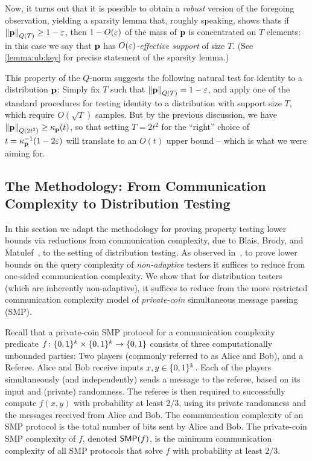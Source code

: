 Now, it turns out that it is possible to obtain a \emph{robust} version of the foregoing observation, yielding a sparsity lemma that, roughly speaking, shows thats if $\lVert\mathbf{p}{\rVert}_{Q(T)} \geq 1-\varepsilon$, then $1- O(\varepsilon)$ of the mass of $\mathbf{p}$ is concentrated on $T$ elements: in this case we say that $\mathbf{p}$ has \emph{$O(\varepsilon)$-effective support} of size $T$. (See \cref{lemma:ub:key} for precise statement of the sparsity lemma.)

 This property of the $Q$-norm suggests the following natural test for identity to a distribution $\mathbf{p}$: Simply fix $T$ such that  $\lVert\mathbf{p}{\rVert}_{Q(T)} = 1-\varepsilon$, and apply one of the standard procedures for testing identity to a distribution with support size $T$, which require $O(\sqrt{T})$ samples. But by the previous discussion, we have $\lVert\mathbf{p}{\rVert}_{Q(2t^2)} \geq \kappa_{\mathbf{p}}(t)$, so that setting $T=2t^2$ for the ``right'' choice of $t=\kappa_{\mathbf{p}}^{-1}(1-2\varepsilon)$ will translate to an $O(t)$ upper bound -- which is what we were aiming for.
 
\subsection{The Methodology: From Communication Complexity to Distribution Testing}\label{sec:methodology}
In this section we adapt the methodology for proving property testing lower bounds via reductions from communication complexity, due to Blais, Brody, and Matulef~\cite{BBM:12}, to the setting of distribution testing.  As observed in~\cite{BBM:12,BMW:11}, to prove lower bounds on the query complexity of \emph{non-adaptive} testers it suffices to reduce from one-sided communication complexity. We show that for distribution testers (which are inherently non-adaptive), it suffices to reduce from the more restricted communication complexity model of \emph{private-coin} simultaneous message passing (SMP).

Recall that a private-coin SMP protocol for a communication complexity predicate $f\colon \{0,1\}^k \times \{0,1\}^k \to \{0,1\}$ consists of three computationally unbounded  parties: Two players (commonly referred to as Alice and Bob), and a Referee. Alice and Bob receive inputs $x,y \in \{0,1\}^k$. Each of the players simultaneously (and independently) sends a message to the referee, based on its input and (private) randomness. The referee is then required to successfully compute $f(x,y)$ with probability at least $2/3$, using its private randomness and the messages received from Alice and Bob. The communication complexity of an SMP protocol is the total number of bits sent by Alice and Bob. The private-coin SMP complexity of $f$, denoted $\mathsf{SMP}(f)$, is the minimum communication complexity of all SMP protocols that solve $f$ with probability at least $2/3$.

